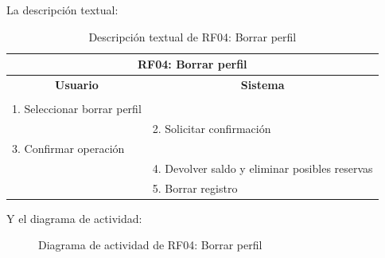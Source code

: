 \begin{itemize}
	La descripción textual:
	\begin{table}[h]
		\centering	
		\begin{tabular}{|l|l|}
			\hline
			\multicolumn{2}{|c|}{\textbf{RF04: Borrar perfil}} \\ \hline
			\multicolumn{1}{|c|}{\textbf{Usuario}} & \multicolumn{1}{c|}{\textbf{Sistema}} \\ \hline
			[Pto. inclusión: RF02: Loguear usuario] &\\ \hline
			1. Seleccionar borrar perfil &\\ \hline
			& 2. Solicitar confirmación\\ \hline
			3. Confirmar operación &\\ \hline
			& 4. Devolver saldo y eliminar posibles reservas \\ \hline
			& 5. Borrar registro \\ \hline
		\end{tabular}
		\caption{Descripción textual de RF04: Borrar perfil}
		\label{tab:tablaDescTextualRF04}
	\end{table}
	
	Y el diagrama de actividad:
	\begin{figure}[!htb]
		\centering
		\caption{Diagrama de actividad de RF04: Borrar perfil}
		\label{fig:diagramaActividad_RF04}
	\end{figure}
	

\end{itemize}
